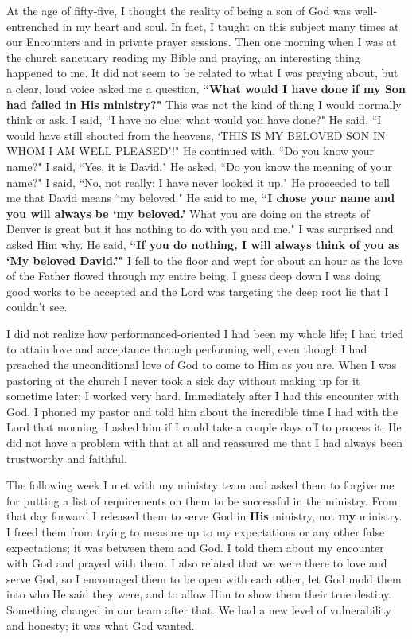 \documentclass[oneside,12pt]{book}
\begin{document}
At the age of fifty-five, I thought the reality of being a son of God was well-entrenched in my heart and soul. In fact, I taught on this subject many times at our Encounters and in private prayer sessions. Then one morning when I was at the church sanctuary reading my Bible and praying, an interesting thing happened to me. It did not seem to be related to what I was praying about, but a clear, loud voice asked me a question, \textbf{``What would I have done if my Son had failed in His ministry?"} This was not the kind of thing I would normally think or ask. I said, ``I have no clue; what would you have done?" He said, ``I would have still shouted from the heavens, `THIS IS MY BELOVED SON IN WHOM I AM WELL PLEASED'!" He continued with, ``Do you know your name?" I said, ``Yes, it is David." He asked, ``Do you know the meaning of your name?" I said, ``No, not really; I have never looked it up." He proceeded to tell me that David means ``my beloved." He said to me, \textbf{``I chose your name and you will always be `my beloved.'} What you are doing on the streets of Denver is great but it has nothing to do with you and me." I was surprised and asked Him why. He said, \textbf{``If you do nothing, I will always think of you as `My beloved David.'"} I fell to the floor and wept for about an hour as the love of the Father flowed through my entire being. I guess deep down I was doing good works to be accepted and the Lord was targeting the deep root lie that I couldn't see.

I did not realize how performanced-oriented I had been my whole life; I had tried to attain love and acceptance through performing well, even though I had preached the unconditional love of God to come to Him as you are. When I was pastoring at the church I never took a sick day without making up for it sometime later; I worked very hard. Immediately after I had this encounter with God, I phoned my pastor and told him about the incredible time I had with the Lord that morning. I asked him if I could take a couple days off to process it. He did not have a problem with that at all and reassured me that I had always been trustworthy and faithful.

The following week I met with my ministry team and asked them to forgive me for putting a list of requirements on them to be successful in the ministry. From that day forward I released them to serve God in \textbf{His} ministry, not \textbf{my} ministry. I freed them from trying to measure up to my expectations or any other false expectations; it was between them and God. I told them about my encounter with God and prayed with them. I also related that we were there to love and serve God, so I encouraged them to be open with each other, let God mold them into who He said they were, and to allow Him to show them their true destiny. Something changed in our team after that. We had a new level of vulnerability and honesty; it was what God wanted. 
\end{document}
